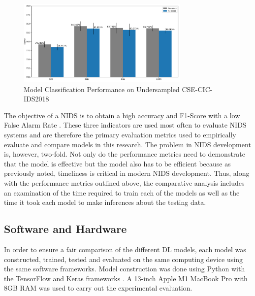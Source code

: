 \documentclass[conference]{IEEEtran}
\begin{document}
\begin{figure}[htpb]
  \centering
  \includegraphics[width=0.75\textwidth]{images/acc_f1_cic.pdf}
  \caption{Model Classification Performance on Undersampled CSE-CIC-IDS2018}
  \label{fig:acc_f1_cic}
\end{figure}

The objective of a NIDS is to obtain a high accuracy and F1-Score with a low False Alarm Rate \cite{b8}. These three indicators are used most often to evaluate NIDS systems \cite{b12} and are therefore the primary evaluation metrics used to empirically evaluate and compare models in this research. The problem in NIDS development is, however, two-fold. Not only do the performance metrics need to demonstrate that the model is effective but the model also has to be efficient because as previously noted, timeliness is critical in modern NIDS development. Thus, along with the performance metrics outlined above, the comparative analysis includes an examination of the time required to train each of the models as well as the time it took each model to make inferences about the testing data. 

\subsection{Software and Hardware}
In order to ensure a fair comparison of the different DL models, each model was constructed, trained, tested and evaluated on the same computing device using the same software frameworks. Model construction was done using Python with the TensorFlow and Keras frameworks \cite{b17}. A 13-inch Apple M1 MacBook Pro with 8GB RAM was used to carry out the experimental evaluation. 

    
\end{document}
